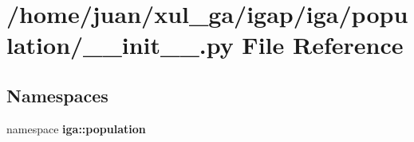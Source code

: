 \section{/home/juan/xul\_\-ga/igap/iga/population/\_\-\_\-init\_\-\_\-.py File Reference}
\label{iga_2population_2____init_____8py}
\subsection*{Namespaces}
\begin{CompactItemize}
\item 
namespace {\bf iga::population}
\end{CompactItemize}
